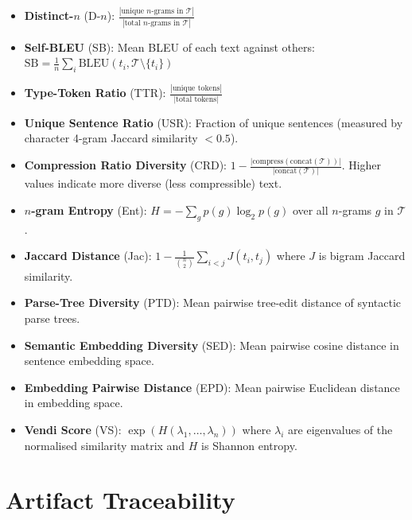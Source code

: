 \documentclass[11pt]{article}
\begin{document}
\begin{itemize}
\item \textbf{Distinct-$n$} (D-$n$): $\frac{|\text{unique $n$-grams in } \mathcal{T}|}{|\text{total $n$-grams in } \mathcal{T}|}$

\item \textbf{Self-BLEU} (SB): Mean BLEU of each text against others:
$\text{SB} = \frac{1}{n} \sum_i \text{BLEU}(t_i, \mathcal{T} \setminus \{t_i\})$

\item \textbf{Type-Token Ratio} (TTR): $\frac{|\text{unique tokens}|}{|\text{total tokens}|}$

\item \textbf{Unique Sentence Ratio} (USR): Fraction of unique sentences
(measured by character 4-gram Jaccard similarity $< 0.5$).

\item \textbf{Compression Ratio Diversity} (CRD): $1 - \frac{|\text{compress}(\text{concat}(\mathcal{T}))|}{|\text{concat}(\mathcal{T})|}$.
Higher values indicate more diverse (less compressible) text.

\item \textbf{$n$-gram Entropy} (Ent): $H = -\sum_g p(g) \log_2 p(g)$
over all $n$-grams $g$ in $\mathcal{T}$.

\item \textbf{Jaccard Distance} (Jac): $1 - \frac{1}{\binom{n}{2}} \sum_{i<j} J(t_i, t_j)$
where $J$ is bigram Jaccard similarity.

\item \textbf{Parse-Tree Diversity} (PTD): Mean pairwise tree-edit distance
of syntactic parse trees.

\item \textbf{Semantic Embedding Diversity} (SED): Mean pairwise cosine
distance in sentence embedding space.

\item \textbf{Embedding Pairwise Distance} (EPD): Mean pairwise Euclidean
distance in embedding space.

\item \textbf{Vendi Score} (VS): $\exp(H(\lambda_1, \ldots, \lambda_n))$
where $\lambda_i$ are eigenvalues of the normalised similarity matrix
and $H$ is Shannon entropy.
\end{itemize}

\section{Artifact Traceability}
\label{app:traceability}
\end{document}
